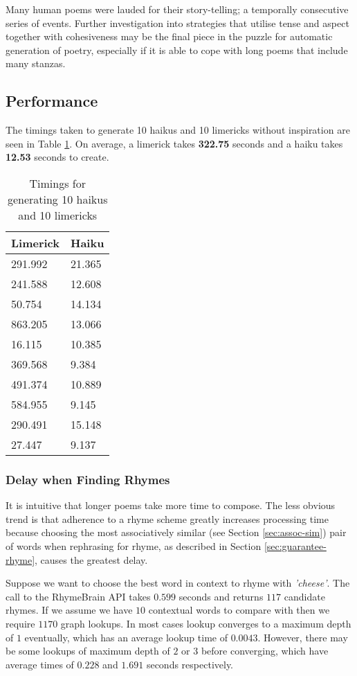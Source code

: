 Many human poems were lauded for their story-telling; a temporally consecutive series of events. Further investigation into strategies that utilise tense and aspect together with cohesiveness may be the final piece in the puzzle for automatic generation of poetry, especially if it is able to cope with long poems that include many stanzas.


\subsection{Performance}
The timings taken to generate 10 haikus and 10 limericks without inspiration are seen in Table \ref{tab:gen}. On average, a limerick takes \textbf{322.75} seconds and a haiku takes \textbf{12.53} seconds to create.

\begin{table}
\centering
    \begin{tabular}{|l|l|}
    \hline
    Limerick & Haiku  \\ \hline
    291.992  & 21.365 \\
    241.588  & 12.608 \\
    50.754   & 14.134 \\
    863.205  & 13.066 \\
    16.115   & 10.385 \\
    369.568  & 9.384  \\
    491.374  & 10.889 \\
    584.955  & 9.145  \\
    290.491  & 15.148 \\
    27.447   & 9.137  \\ \hline
    \end{tabular}
\caption{Timings for generating 10 haikus and 10 limericks}
\label{tab:gen}
\end{table}

\subsubsection{Delay when Finding Rhymes}

It is intuitive that longer poems take more time to compose. The less obvious trend is that adherence to a rhyme scheme greatly increases processing time because choosing the most associatively similar (see Section \ref{sec:assoc-sim}) pair of words when rephrasing for rhyme, as described in Section \ref{sec:guarantee-rhyme}, causes the greatest delay.

Suppose we want to choose the best word in context to rhyme with \textit{'cheese'}. The call to the RhymeBrain API\cite{rhymebrain} takes $0.599$ seconds and returns $117$ candidate rhymes. If we assume we have $10$ contextual words to compare with then we require $1170$ graph lookups. In most cases lookup converges to a maximum depth of $1$ eventually, which has an average lookup time of $0.0043$. However, there may be some lookups of maximum depth of $2$ or $3$ before converging, which have average times of $0.228$ and $1.691$ seconds respectively. 

